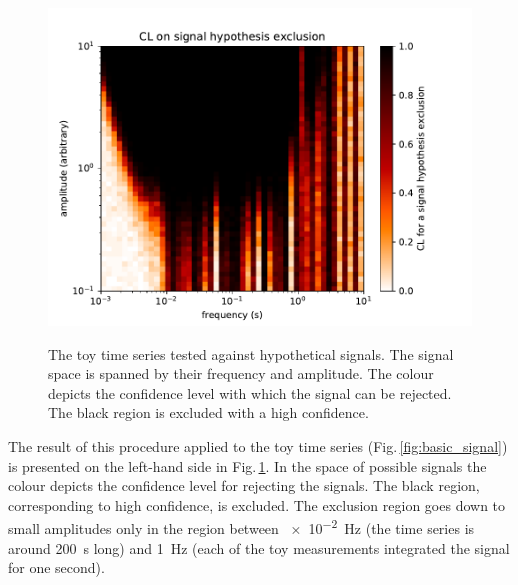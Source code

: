 \begin{figure}
  \centering
  \subfloat[The test without the use of the CLs method.]
  {\label{fig:axions_exclusion_noCLs}
  \includegraphics[width=.5\linewidth]{gfx/axions/basic_exclusion_noCls.pdf}}
  \caption{The toy time series tested against hypothetical signals. The signal space is spanned by their frequency and amplitude. The colour depicts the confidence level with which the signal can be rejected. The black region is excluded with a high confidence. }\label{fig:axions_exclusions}
\end{figure}

The result of this procedure applied to the toy time series (Fig.\,\ref{fig:basic_signal}) is presented on the left-hand side in Fig.\,\ref{fig:axions_exclusions}. In the space of possible signals the colour depicts the confidence level for rejecting the signals. The black region, corresponding to high confidence, is excluded. The exclusion region goes down to small amplitudes only in the region between \SI{e-2}{\hertz} (the time series is around \SI{200}{\second} long) and \SI{1}{\hertz} (each of the toy measurements integrated the signal for one second).

